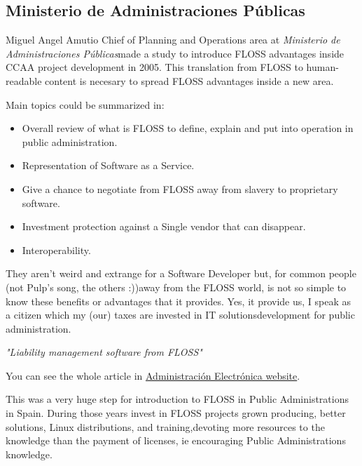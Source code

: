 \subsection{Ministerio de Administraciones Públicas}

\par Miguel Angel Amutio Chief of Planning and Operations area at \textit{Ministerio de Administraciones Públicas}made a study to introduce FLOSS advantages inside CCAA project development in 2005. This translation from FLOSS to human-readable content is necesary to spread FLOSS advantages inside a new area.

\par Main topics could be summarized in:

\begin{itemize}
	\item Overall review of what is FLOSS to define, explain and put into operation in public administration.
	\item Representation of Software as a Service.
	\item Give a chance to negotiate from FLOSS away from slavery to proprietary software.
	\item Investment protection against a Single vendor that can disappear.
	\item Interoperability.
\end{itemize} They aren't weird and extrange for a Software Developer but, for common people (not Pulp's song, the others :))away from the FLOSS world, is not so simple to know these benefits or advantages that it provides. Yes, it provide us, I speak as a citizen which my (our) taxes are invested in IT solutionsdevelopment for public administration.

\par \textit{"Liability management software from FLOSS"}

\par You can see the whole article in \href{http://administracionelectronica.gob.es/?_nfpb=true&amp;_pageLabel=P803324061272301226576&amp;langPae=es&amp;detalleLista=PAE_000001307}{Administraci\'on Electr\'onica website}.

\par This was a very huge step for introduction to FLOSS in Public Administrations in Spain. During those years invest in FLOSS projects grown producing, better solutions, Linux distributions, and training,devoting more resources to the knowledge than the payment of licenses, ie encouraging Public Administrations knowledge.

